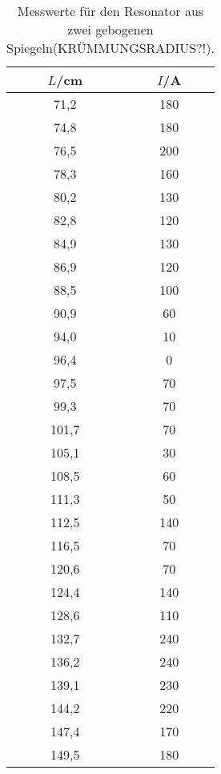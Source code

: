 \begin{table}[htp]
  \caption{Messwerte für den Resonator aus zwei gebogenen Spiegeln(KRÜMMUNGSRADIUS?!).}
  \label{tab:konkavkonkav}
	\begin{center}
		\begin{tabular}{cc}
		\toprule
			{$L$/cm} & {$I$/\mu A}\\
			\midrule
			71,2 & 180\\
			74,8 & 180\\
			76,5 & 200\\
			78,3 & 160\\
			80,2 & 130\\
			82,8 & 120\\
			84,9 & 130\\
			86,9 & 120\\
			88,5 & 100\\
			90,9 & 60\\
			94,0 & 10\\
			96,4 & 0\\
			97,5 & 70\\
			99,3 & 70\\
			101,7 & 70\\
			105,1 & 30\\
			108,5 & 60\\
			111,3 & 50\\
			112,5 & 140\\
			116,5 & 70\\
			120,6 & 70\\
			124,4 & 140\\
			128,6 & 110\\
			132,7 & 240\\
			136,2 & 240\\
			139,1 & 230\\
			144,2 & 220\\
			147,4 & 170\\
			149,5 & 180\\
		\bottomrule
		\end{tabular}
	\end{center}
\end{table}

